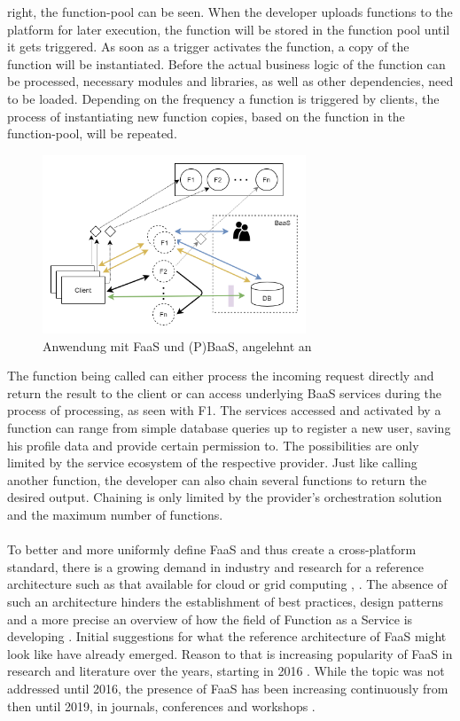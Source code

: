 \documentclass[11pt]{article}
\begin{document}
right, the function-pool can be seen. When the developer uploads functions to the platform for later execution, the function will be stored in the function pool until it gets triggered. As soon as a trigger activates the function, a copy of the function will be instantiated. Before the actual business logic of the function can be processed, necessary modules and libraries, as well as other dependencies, need to be loaded. Depending on the frequency a function is triggered by clients, the process of instantiating new function copies, based on the function in the function-pool, will be repeated.    
\begin{figure}[H]
\caption{Anwendung mit FaaS und (P)BaaS, angelehnt an \cite{shafiei2020serverless}}
\label{fig:FaaSBaaSExample}
\centering
\includegraphics[width=0.7\textwidth]{FaaS}
\end{figure}
The function being called can either process the incoming request directly and return the result to the client or can access underlying BaaS services during the process of processing, as seen with F1. The services accessed and activated by a function can range from simple database queries up to register a new user, saving his profile data and provide certain permission to. The possibilities are only limited by the service ecosystem of the respective provider. Just like calling another function, the developer can also chain several functions to return the desired output. Chaining is only limited by the provider's orchestration solution and the maximum number of functions.\\\\ To better and more uniformly define FaaS and thus create a cross-platform standard, there is a growing demand in industry and research for a reference architecture such as that available for cloud or grid computing \cite{liu2011nist}, \cite{foster2003grid}. The absence of such an architecture hinders the establishment of best practices, design patterns and a more precise an overview of how the field of Function as a Service is developing \cite{leitner2019mixed}. Initial suggestions for what the reference architecture of FaaS might look like have already emerged. Reason to that is increasing popularity of FaaS in research and literature over the years, starting in 2016  \cite{van2019spec}. While the topic was not addressed until 2016, the presence of FaaS has been increasing continuously from then until 2019, in journals, conferences and workshops \cite{Yussupov2019_SystematicMappingStudyFaaS}.
\end{document}
